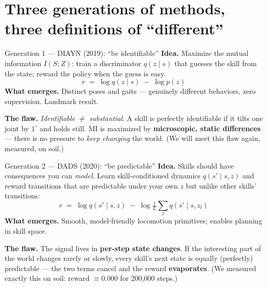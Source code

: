 \documentclass[aspectratio=169,11pt]{beamer}
\begin{document}
\section{Three generations of methods, three definitions of ``different''}

\begin{frame}{Generation 1 --- DIAYN (2019): ``be identifiable''}
\textbf{Idea.} Maximize the mutual information $I(S;Z)$: train a discriminator $q(z \mid s)$ that guesses the skill from the state; reward the policy when the guess is easy.
\[
r \;=\; \log q(z \mid s) \;-\; \log p(z)
\]
\textbf{What emerges.} Distinct poses and gaits --- genuinely different behaviors, zero supervision. Landmark result.

\bigskip
\textbf{The flaw.} \emph{Identifiable} $\neq$ \emph{substantial}. A skill is perfectly identifiable if it tilts one joint by $1^\circ$ and holds still. MI is maximized by \textbf{microscopic, static differences} --- there is no pressure to \emph{keep changing} the world. (We will meet this flaw again, measured, on soil.)
\end{frame}

\begin{frame}{Generation 2 --- DADS (2020): ``be predictable''}
\textbf{Idea.} Skills should have consequences you can \emph{model}. Learn skill-conditioned dynamics $q(s' \mid s, z)$ and reward transitions that are predictable under your own $z$ but unlike other skills' transitions:
\[
r \;=\; \log q(s' \mid s, z) \;-\; \log \tfrac{1}{L}\textstyle\sum_{l} q(s' \mid s, z_l)
\]
\textbf{What emerges.} Smooth, model-friendly locomotion primitives; enables planning in skill space.

\bigskip
\textbf{The flaw.} The signal lives in \textbf{per-step state changes}. If the interesting part of the world changes rarely or slowly, every skill's next state is equally (perfectly) predictable --- the two terms cancel and the reward \textbf{evaporates}. (We measured exactly this on soil: reward $\equiv 0.000$ for 200{,}000 steps.)
\end{frame}
\end{document}
